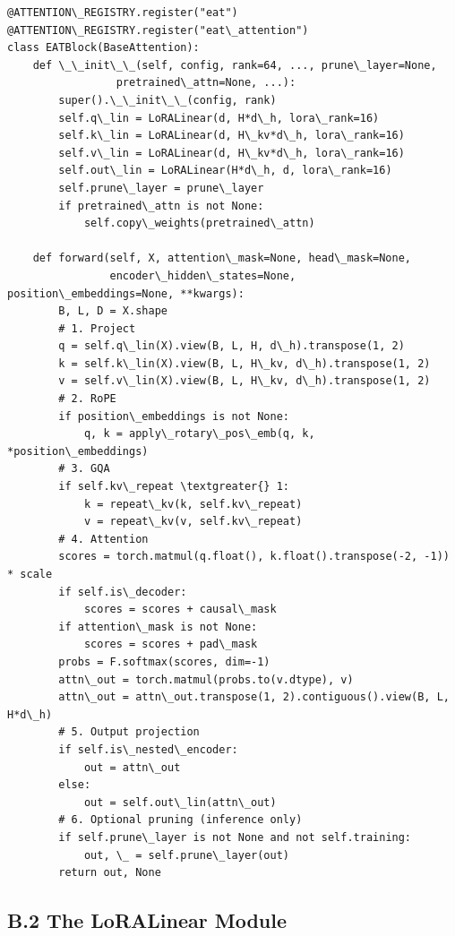\begin{lstlisting}
@ATTENTION\_REGISTRY.register("eat")
@ATTENTION\_REGISTRY.register("eat\_attention")
class EATBlock(BaseAttention):
    def \_\_init\_\_(self, config, rank=64, ..., prune\_layer=None,
                 pretrained\_attn=None, ...):
        super().\_\_init\_\_(config, rank)
        self.q\_lin = LoRALinear(d, H*d\_h, lora\_rank=16)
        self.k\_lin = LoRALinear(d, H\_kv*d\_h, lora\_rank=16)
        self.v\_lin = LoRALinear(d, H\_kv*d\_h, lora\_rank=16)
        self.out\_lin = LoRALinear(H*d\_h, d, lora\_rank=16)
        self.prune\_layer = prune\_layer
        if pretrained\_attn is not None:
            self.copy\_weights(pretrained\_attn)
    
    def forward(self, X, attention\_mask=None, head\_mask=None,
                encoder\_hidden\_states=None, position\_embeddings=None, **kwargs):
        B, L, D = X.shape
        # 1. Project
        q = self.q\_lin(X).view(B, L, H, d\_h).transpose(1, 2)
        k = self.k\_lin(X).view(B, L, H\_kv, d\_h).transpose(1, 2)
        v = self.v\_lin(X).view(B, L, H\_kv, d\_h).transpose(1, 2)
        # 2. RoPE
        if position\_embeddings is not None:
            q, k = apply\_rotary\_pos\_emb(q, k, *position\_embeddings)
        # 3. GQA
        if self.kv\_repeat \textgreater{} 1:
            k = repeat\_kv(k, self.kv\_repeat)
            v = repeat\_kv(v, self.kv\_repeat)
        # 4. Attention
        scores = torch.matmul(q.float(), k.float().transpose(-2, -1)) * scale
        if self.is\_decoder:
            scores = scores + causal\_mask
        if attention\_mask is not None:
            scores = scores + pad\_mask
        probs = F.softmax(scores, dim=-1)
        attn\_out = torch.matmul(probs.to(v.dtype), v)
        attn\_out = attn\_out.transpose(1, 2).contiguous().view(B, L, H*d\_h)
        # 5. Output projection
        if self.is\_nested\_encoder:
            out = attn\_out
        else:
            out = self.out\_lin(attn\_out)
        # 6. Optional pruning (inference only)
        if self.prune\_layer is not None and not self.training:
            out, \_ = self.prune\_layer(out)
        return out, None
\end{lstlisting}

\subsection{B.2 The LoRALinear Module}


